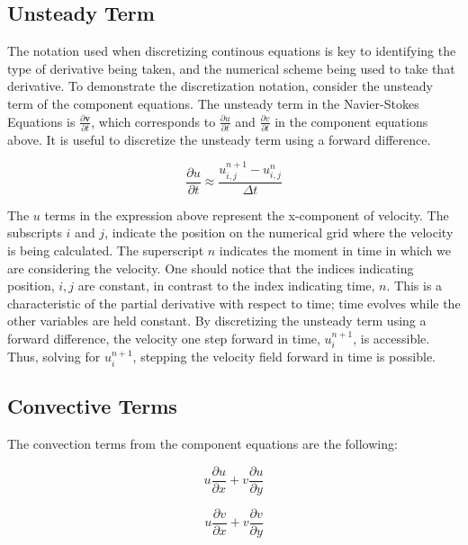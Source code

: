 \documentclass[twocolumn,12pth]{article}
\begin{document}
\subsection{Unsteady Term}

The notation used when discretizing continous equations is key to identifying the type of derivative being taken, and the numerical scheme being used to take that derivative.
To demonstrate the discretization notation, consider the unsteady term of the component equations.
The unsteady term in the Navier-Stokes Equations is $\frac{\partial{\mathbf{v}}}{\partial{t}}$, which corresponds to $\frac{\partial{u}}{\partial{t}}$ and $\frac{\partial{v}}{\partial{t}}$ in the component equations above.
It is useful to discretize the unsteady term using a forward difference.

\begin{equation}
\frac{\partial{u}}{\partial{t}} \approx \frac{u_{i,j}^{n+1} - u_{i,j}^{n}}{\Delta{t}}
\end{equation}

The $u$ terms in the expression above represent the x-component of velocity.
The subscripts $i$ and $j$, indicate the position on the numerical grid where the velocity is being calculated.
The superscript $n$ indicates the moment in time in which we are considering the velocity.
One should notice that the indices indicating position, $i,j$ are constant, in contrast to the index indicating time, $n$.
This is a characteristic of the partial derivative with respect to time; time evolves while the other variables are held constant.
By discretizing the unsteady term using a forward difference, the velocity one step forward in time, $u_{i}^{n+1}$, is accessible.
Thus, solving for $u_{i}^{n+1}$, stepping the velocity field forward in time is possible.

\subsection{Convective Terms}

The convection terms from the component equations are the following:

\begin{equation}
u\frac{\partial{u}}{\partial{x}} + v\frac{\partial{u}}{\partial{y}}
\end{equation}

\begin{equation*}
u\frac{\partial{v}}{\partial{x}} + v\frac{\partial{v}}{\partial{y}}
\end{equation*}
\end{document}
